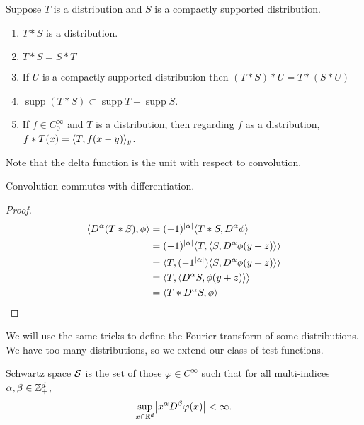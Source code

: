 \documentclass[10pt, twoside]{article}
\begin{document}
    \begin{lem}
        Suppose $T$ is a distribution and $S$ is a compactly supported distribution.
        \begin{enumerate}
            \item $T*S$ is a distribution.
            \item $T*S=S*T$
            \item If $U$ is a compactly supported distribution then $(T*S)*U = T*(S*U)$
            \item $\operatorname{supp}(T*S) \subset \operatorname{supp}T + \operatorname{supp}S$.
            \item If $f \in C_0^{\infty}$ and $T$ is a distribution, then regarding $f$ as a distribution, $f*T(x) = \langle T,f(x-y)\rangle_y$.
        \end{enumerate}
    \end{lem}

    \begin{rmk}
        Note that the delta function is the unit with respect to convolution.
    \end{rmk}

    \begin{lem}
        Convolution commutes with differentiation.
        \begin{proof}
            \begin{align*}
                \langle D^{\alpha}(T*S),\phi\rangle &= (-1)^{\lvert\alpha\rvert} \langle T*S,D^{\alpha} \phi\rangle \\
                                           &= (-1)^{\lvert\alpha\rvert} \langle T,\langle S,D^{\alpha} \phi(y+z)\rangle\rangle\\
                                           &= \langle T,(-1^{\lvert\alpha\rvert})\langle S,D^{\alpha} \phi(y+z)\rangle\rangle\\
                                           &= \langle T, \langle D^{\alpha}S, \phi(y+z)\rangle\rangle \\
                                           &= \langle T*D^{\alpha}S, \phi\rangle
            \end{align*}
        \end{proof}
    \end{lem}

    We will use the same tricks to define the Fourier transform of some distributions. We have too many distributions, so we extend our class of test functions.

    \begin{defn}
        Schwartz space $\mathcal{S}$ is the set of those $\varphi \in C^{\infty}$ such that for all multi-indices $\alpha, \beta \in \mathbb{Z}_+^d$, \[\sup_{x \in \R^d} \abs*{x^{\alpha}D^{\beta} \varphi(x)} < \infty.\]
    \end{defn}
\end{document}

